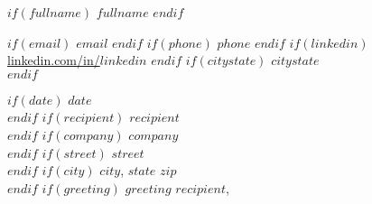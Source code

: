 \begin{center}
$if(fullname)$
{\fontsize{18}{0}\selectfont\scshape $fullname$}
$endif$
\end{center}
\begin{center}
$if(email)$
\href{mailto: $email$}{\faEnvelope\enspace $email$}\hfill
$endif$
$if(phone)$
\href{tel: $phone$}{\faPhone\enspace $phone$}\hfill
$endif$
$if(linkedin)$
\href{https://linkedin.com/in/$linkedin$}{\faLinkedinIn\enspace linkedin.com/in/$linkedin$}\hfill
$endif$
$if(citystate)$
\faMapMarker\enspace $citystate$\\
$endif$
\noindent\makebox[\linewidth]{\rule{\textwidth}{0.5pt}}
\end{center}
\renewcommand{\labelitemi}{-}
$if(date)$
$date$\vspace{0.1in}\\
$endif$
$if(recipient)$
$recipient$\\
$endif$
$if(company)$
$company$\\
$endif$
$if(street)$
$street$\\
$endif$
$if(city)$
$city$, $state$ $zip$\vspace{0.1in}\\
$endif$
$if(greeting)$
\vspace{-0.1in}$greeting$ $recipient$,\vspace{0.1in}\\

